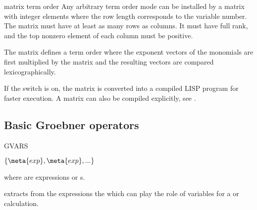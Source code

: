 \begin{Concept}{matrix term order}
Any arbitrary term order mode can be installed by a matrix with
integer elements where the row length corresponds to the variable
number. The matrix must have at least as many rows as columns.
It must have full rank, and the top nonzero element of each column
must be positive.

The matrix 
defines a term order where the exponent vectors of the monomials are
first multiplied by the matrix and the resulting vectors are compared
lexicographically.

If the switch  is on, the matrix is converted into
a compiled LISP program for faster execution. A matrix can also be
compiled explicitly, see .
\end{Concept}
\subsection{Basic Groebner operators}
\begin{Operator}{GVARS}
\begin{Syntax}

  \(\{\meta{exp},\meta{exp},... \}\)

\end{Syntax}
 where  are expressions or s.

 extracts from the expressions the  
which can 
play the role of variables for a  or  
calculation. 
\end{Operator}


